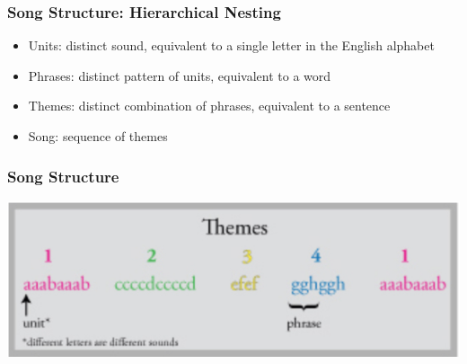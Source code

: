 \documentclass[12pt]{beamer}\usepackage[]{graphicx}\usepackage[]{color}
\begin{document}
\begin{frame}
\frametitle{Song Structure: Hierarchical Nesting}
\begin{itemize}
\item<1-> Units: distinct sound, equivalent to a single letter in the English alphabet 
\item<2-> Phrases: distinct pattern of units, equivalent to a word
\item<3-> Themes: distinct combination of phrases, equivalent to a sentence 
\item<4-> Song: sequence of themes
\end{itemize}
\end{frame}

\begin{frame}
\frametitle{Song Structure}
   \includegraphics[width=1.0\linewidth]{SongStructure.jpg}
\end{frame}

\end{document}
